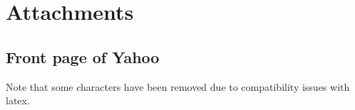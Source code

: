 \pagebreak
\section{Attachments}

\subsection{Front page of Yahoo}
Note that some characters have been removed due to compatibility issues
with latex.

\label{att:yahooindex}

